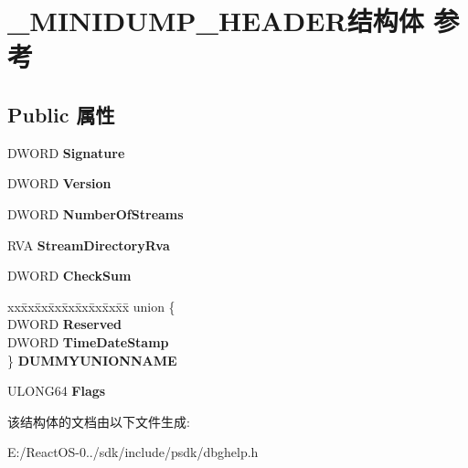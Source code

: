 \hypertarget{struct___m_i_n_i_d_u_m_p___h_e_a_d_e_r}{}\section{\+\_\+\+M\+I\+N\+I\+D\+U\+M\+P\+\_\+\+H\+E\+A\+D\+E\+R结构体 参考}
\label{struct___m_i_n_i_d_u_m_p___h_e_a_d_e_r}
\subsection*{Public 属性}
\begin{DoxyCompactItemize}
\item 
\mbox{\label{struct___m_i_n_i_d_u_m_p___h_e_a_d_e_r_a2715698353fef63c1d73ddda458318a5}} 
D\+W\+O\+RD {\bfseries Signature}
\item 
\mbox{\label{struct___m_i_n_i_d_u_m_p___h_e_a_d_e_r_a9d920326ea998af6734f33a818d6b97c}} 
D\+W\+O\+RD {\bfseries Version}
\item 
\mbox{\label{struct___m_i_n_i_d_u_m_p___h_e_a_d_e_r_a1f71745acd2a5df0a6ba4b822e1fb72a}} 
D\+W\+O\+RD {\bfseries Number\+Of\+Streams}
\item 
\mbox{\label{struct___m_i_n_i_d_u_m_p___h_e_a_d_e_r_a7eace21a188551d3700b3a50e060e0f7}} 
R\+VA {\bfseries Stream\+Directory\+Rva}
\item 
\mbox{\label{struct___m_i_n_i_d_u_m_p___h_e_a_d_e_r_ae321c2ef2bac72643af010b16281e52b}} 
D\+W\+O\+RD {\bfseries Check\+Sum}
\item 
\mbox{\label{struct___m_i_n_i_d_u_m_p___h_e_a_d_e_r_af5331a20a1dbb2af7d007ab4bb523c21}} 
\begin{tabbing}
xx\=xx\=xx\=xx\=xx\=xx\=xx\=xx\=xx\=\kill
union \{\\
\>DWORD {\bfseries Reserved}\\
\>DWORD {\bfseries TimeDateStamp}\\
\} {\bfseries DUMMYUNIONNAME}\\

\end{tabbing}\item 
\mbox{\label{struct___m_i_n_i_d_u_m_p___h_e_a_d_e_r_ad0ecfbdf8a9de6dbf12f1f2a8e317089}} 
U\+L\+O\+N\+G64 {\bfseries Flags}
\end{DoxyCompactItemize}


该结构体的文档由以下文件生成\+:\begin{DoxyCompactItemize}
\item 
E\+:/\+React\+O\+S-\/0../sdk/include/psdk/dbghelp.\+h\end{DoxyCompactItemize}
